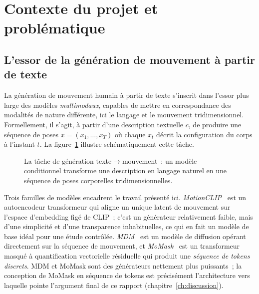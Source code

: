 \documentclass[12pt,a4paper,oneside]{report}
\theoremstyle{definition}
\theoremstyle{plain}
\begin{document}
\section{Contexte du projet et problématique}

\subsection{L'essor de la génération de mouvement à partir de texte}

La génération de mouvement humain à partir de texte s'inscrit dans l'essor plus
large des modèles \emph{multimodaux}, capables de mettre en correspondance des
modalités de nature différente, ici le langage et le mouvement
tridimensionnel. Formellement, il s'agit, à partir d'une description textuelle
$c$, de produire une séquence de poses $x = (x_1,\dots,x_T)$ où chaque $x_t$
décrit la configuration du corps à l'instant $t$. La figure~\ref{fig:t2m}
illustre schématiquement cette tâche.

\begin{figure}[ht]
\centering
{}
\caption{La tâche de génération texte$\rightarrow$mouvement~: un modèle
conditionnel transforme une description en langage naturel en une séquence de
poses corporelles tridimensionnelles.}
\label{fig:t2m}
\end{figure}

Trois familles de modèles encadrent le travail présenté ici.
\emph{MotionCLIP}~\cite{tevet2022motionclip} est un autoencodeur transformeur qui
aligne un unique latent de mouvement sur l'espace d'embedding figé de CLIP~; c'est
un générateur relativement faible, mais d'une simplicité et d'une transparence
inhabituelles, ce qui en fait un modèle de base idéal pour une étude contrôlée.
\emph{MDM}~\cite{tevet2023mdm} est un modèle de diffusion opérant directement sur
la séquence de mouvement, et \emph{MoMask}~\cite{guo2024momask} est un
transformeur masqué à quantification vectorielle résiduelle qui produit une
\emph{séquence de tokens discrets}. MDM et MoMask sont des générateurs nettement
plus puissants~; la conception de MoMask en séquence de tokens est précisément
l'architecture vers laquelle pointe l'argument final de ce rapport
(chapitre~\ref{ch:discussion}).
\end{document}
